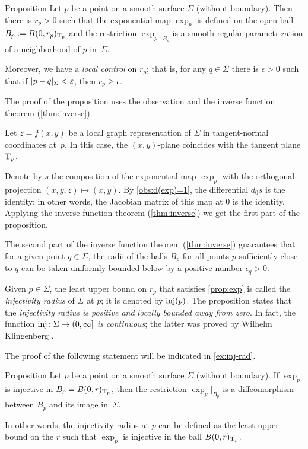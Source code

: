 \begin{thm}{Proposition}\label{prop:exp}
Let $p$ be a point on a smooth surface $\Sigma$ (without boundary).
Then there is $r_p>0$ such that
the exponential map $\exp_p$ is defined on the open ball $B_p\mathrel{:=} B(0,r_p)_{\mathrm{T}_p}$
and the restriction $\exp_p|_{B_p}$ is a smooth regular parametrization of a neighborhood of $p$ in~$\Sigma$.

Moreover, we have a {}\emph{local control} on $r_p$;
that is, for any $q\in \Sigma$ there is $\epsilon>0$ such that if $\dist{p}{q}\Sigma<\epsilon$, then $r_p\ge\epsilon$.
\end{thm}

The proof of the proposition uses the observation and the inverse function theorem (\ref{thm:inverse}).

Let $z=f(x,y)$ be a local graph representation of $\Sigma$ in tangent-normal coordinates at~$p$.
In this case, the $(x,y)$-plane coincides with the tangent plane $\mathrm{T}_p$.

Denote by $s$ the composition of the exponential map $\exp_p$ with the orthogonal projection $(x,y,z)\mapsto (x,y)$.
By \ref{obs:d(exp)=1}, the differential $d_0s$ is the identity;
in other words, the Jacobian matrix of this map at $0$ is the identity.
Applying the inverse function theorem (\ref{thm:inverse}) we get the first part of the proposition.

The second part of the inverse function theorem (\ref{thm:inverse}) 
 guarantees that for a given point $q\in \Sigma$, the radii of the balls $B_p$
 for all points $p$ sufficiently close to $q$
 can be taken uniformly 
 bounded below by a positive number $\epsilon_q >0$.
\qeds

Given $p\in \Sigma$, the least upper bound on $r_p$ that satisfies \ref{prop:exp} is called the \emph{injectivity radius} of $\Sigma$ at $p$;
it is denoted by $\mathop{\rm inj}\nolimits(p)$.
The proposition states that the \textit{injectivity radius is positive and locally bounded away from zero}.
In fact, the function \textit{$\mathop{\rm inj}\nolimits\colon\Sigma\to (0,\infty]$ is continuous};
the latter was proved by Wilhelm Klingenberg \cite[5.4]{gromoll-klingenberg-meyer}. 

The proof of the following statement will be indicated in \ref{ex:inj-rad}.

\begin{thm}{Proposition}\label{prop:inj-rad}
Let $p$ be a point on a smooth surface $\Sigma$ (without boundary).
If $\exp_p$ is injective in $B_p=B(0,r)_{\mathrm{T}_p}$, then the restriction $\exp_p|_{B_p}$ is a diffeomorphism between $B_p$ and its image in~$\Sigma$.

In other words, the injectivity radius at $p$ can be defined as the least upper bound on the $r$ such that $\exp_p$ is injective in the ball $B(0,r)_{\mathrm{T}_p}$.
\end{thm}


